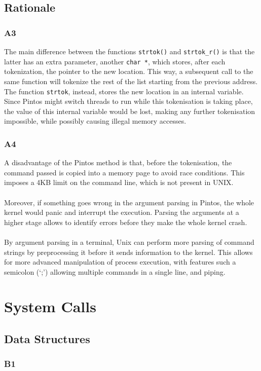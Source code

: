 \documentclass[a4wide, 11pt]{article}
\newcommand{\tx}{\texttt}
\begin{document}
\subsection{Rationale}
\subsubsection{A3}
The main difference between the functions \tx{strtok()} and \tx{strtok\_r()} is that the latter has an extra parameter, another \tx{char *}, which stores, after each tokenization, the pointer to the new location. This way, a subsequent call to the same function will tokenize the rest of the list starting from the previous address. The function \tx{strtok}, instead, stores the new location in an internal variable. Since Pintos might switch threads to run while this tokenisation is taking place, the value of this internal variable would be lost, making any further tokenisation impossible, while possibly causing illegal memory accesses.
\subsubsection{A4}
A disadvantage of the Pintos method is that, before the tokenisation, the command passed is copied into a memory page to avoid race conditions. This imposes a 4KB limit on the command line, which is not present in UNIX. \\\\
Moreover, if something goes wrong  in the argument parsing in Pintos, the whole kernel would panic and interrupt the execution. Parsing the arguments at a higher stage allows to identify errors before they make the whole kernel crash.\\\\
By argument parsing in a terminal, Unix can perform more parsing of command strings by preprocessing it before it sends information to the kernel. This allows for more advanced manipulation of process execution, with features such a semicolon (`;') allowing multiple commands in a single line, and piping.

\section{System Calls}
\subsection{Data Structures}
\subsubsection{B1}
\end{document}

